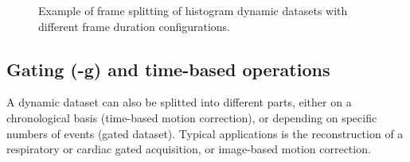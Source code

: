 \documentclass[a4paper, 11pt]{article}
\begin{document}
\begin{figure} [h]
  \centerline
  {
  }
  \caption{Example of frame splitting of histogram dynamic datasets with different frame duration configurations.}
  \label{fig_framing_hist}
\end{figure}




\subsection{Gating (-g) and time-based operations}


A dynamic dataset can also be splitted into different parts, either on a chronological basis (time-based motion correction), or depending on specific numbers of events (gated dataset). Typical applications is the reconstruction of a respiratory or cardiac gated acquisition, or image-based motion correction. 
\end{document}
